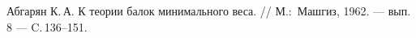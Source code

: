 \begin{thebibliography}{1}
{Абгарян К.\,А.} {К теории балок минимального веса.} // М.:~Машгиз, 1962. --- вып. 8 ---
C.\,136\nobreakdash--151.
%
%
%
%
%
%
%
%
%
%
%
%
%
%
%
%
%
%
%
%
%
%
%
%
%
%
%
%
%
%
%
%
%
%
%
%
%
%
%
%
%
%

\end{thebibliography}
